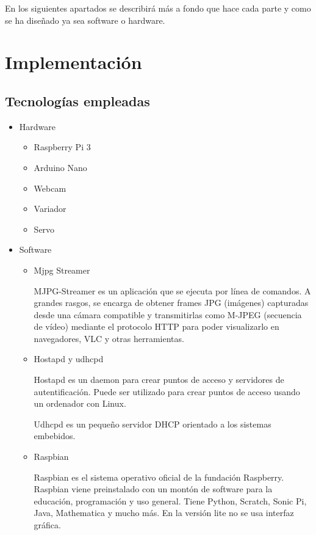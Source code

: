 \documentclass{pclass}
\begin{document}
En los siguientes apartados se describirá más a fondo que hace cada parte y como se ha diseñado ya sea software o hardware.
 
\section{Implementación} 
\subsection{Tecnologías empleadas}

\begin{itemize}
	\item Hardware
		\begin{itemize}
			\item Raspberry Pi 3
			\item Arduino Nano
			\item Webcam
			\item Variador
			\item Servo
		\end{itemize}
	\item Software
	\begin{itemize}
		\item Mjpg Streamer
		
		MJPG-Streamer es un aplicación que se ejecuta por línea de comandos. A grandes rasgos, se encarga de obtener frames JPG (imágenes) capturadas desde una cámara compatible y transmitirlas como M-JPEG (secuencia de vídeo) mediante el protocolo HTTP para poder visualizarlo en navegadores, VLC y otras herramientas.
			\cite{mjpg}
		
		\item Hostapd y udhcpd
		
		Hostapd es un daemon para crear puntos de acceso y servidores de autentificación. Puede ser utilizado para crear puntos de acceso usando un ordenador con Linux. 
		
		Udhcpd es un pequeño servidor DHCP orientado a los sistemas embebidos.
		
			\cite{wireless}
		
		\item Raspbian	
		
		Raspbian es el sistema operativo oficial de la fundación Raspberry. Raspbian viene preinstalado con un montón de software para la educación, programación y uso general. Tiene Python, Scratch, Sonic Pi, Java, Mathematica y mucho más. En la versión lite no se usa interfaz gráfica.
		

\end{itemize}
\end{itemize}
\end{document}
